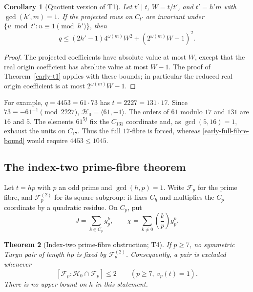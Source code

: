 \documentclass[11pt]{article}
\newtheorem{theorem}{Theorem}[section]
\newtheorem{corollary}[theorem]{Corollary}
\theoremstyle{definition}
\theoremstyle{remark}
\begin{document}
\begin{corollary}[Quotient version of T1]
\label{early-t1-quotient}
Let $t'\mid t$, $W=t/t'$, and $t'=h'm$ with $\gcd(h',m)=1$. If the
projected rows on $C_{t'}$ are invariant under
$\{u\bmod t':u\equiv1\pmod{h'}\}$, then
\[
 q\leq(2h'-1)4^{\omega(m)}W^2+
                     (2^{\omega(m)}W-1)^2.
\]
\end{corollary}
\begin{proof}
The projected coefficients have absolute value at most $W$, except that
the real origin coefficient has absolute value at most $W-1$. The proof
of Theorem~\ref{early-t1} applies with these bounds; in particular the
reduced real origin coefficient is at most $2^{\omega(m)}W-1$.
\end{proof}

For example, $q=4453=61\cdot73$ has $t=2227=131\cdot17$. Since
$73\equiv-61^{-1}\pmod{2227}$, $\mathcal H_0=\langle61,-1\rangle$. The
orders of $61$ modulo $17$ and $131$ are $16$ and $5$. The elements
$61^{5j}$ fix the $C_{131}$ coordinate and, as $\gcd(5,16)=1$, exhaust
the units on $C_{17}$. Thus the full $17$-fibre is forced, whereas
\eqref{early-full-fibre-bound} would require $4453\leq1045$.

\subsection{The index-two prime-fibre theorem}
\label{early-index-two}

Let $t=hp$ with $p$ an odd prime and $\gcd(h,p)=1$. Write $\mathcal F_p$
for the prime fibre, and $\mathcal F_p^{(2)}$ for its square subgroup:
it fixes $C_h$ and multiplies the $C_p$ coordinate by a quadratic residue.
On $C_p$, put
\[
 J=\sum_{k\in C_p}g_p^k,\qquad
 \chi=\sum_{k\ne0}\left(\frac{k}{p}\right)g_p^k.
\]

\begin{theorem}[Index-two prime-fibre obstruction; T4]
\label{early-t4}
If $p\geq7$, no symmetric Turyn pair of length $hp$ is fixed by
$\mathcal F_p^{(2)}$. Consequently, a pair is excluded whenever
\[
 [\mathcal F_p:\mathcal H_0\cap\mathcal F_p]\leq2
 \qquad(p\geq7,\ v_p(t)=1).
\]
There is no upper bound on $h$ in this statement.
\end{theorem}
\end{document}
